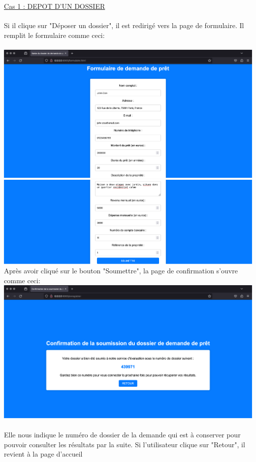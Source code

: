 \documentclass{article}
\begin{document}
    \underline{Cas 1 : DEPOT D'UN DOSSIER} \\ \\
    Si il clique sur "Déposer un dossier", il est redirigé vers la page de formulaire. Il remplit le formulaire comme ceci:
    \\ \\
		\includegraphics[width=\textwidth]{Images/8.2/formulairea1.png} \\
		\includegraphics[width=\textwidth]{Images/8.2/formulairea2.png} \\
     Après avoir cliqué sur le bouton "Soumettre", la page de confirmation s’ouvre comme ceci:
        \\
		\includegraphics[width=\textwidth]{Images/8.2/depota.png} \\
		\\
    Elle nous indique le numéro de dossier de la demande qui est à conserver pour pouvoir consulter les résultats par la suite. Si l'utilisateur clique sur "Retour", il revient à la page d'accueil \\ \\
\end{document}
